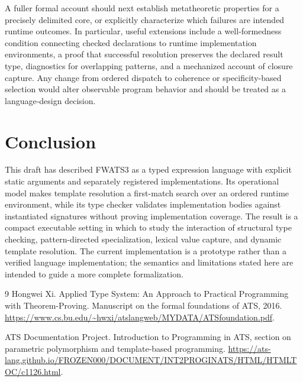 \documentclass[11pt]{article}
\begin{document}
A fuller formal account should next establish metatheoretic properties for a
precisely delimited core, or explicitly characterize which failures are
intended runtime outcomes. In particular, useful extensions include a
well-formedness condition connecting checked declarations to runtime
implementation environments, a proof that successful resolution preserves
the declared result type, diagnostics for overlapping patterns, and a
mechanized account of closure capture. Any change from
ordered dispatch to coherence or specificity-based selection would alter
observable program behavior and should be treated as a language-design
decision.

\section{Conclusion}

This draft has described FWATS3 as a typed expression language with explicit
static arguments and separately registered implementations. Its operational
model makes template resolution a first-match search over an ordered runtime
environment, while its type checker validates implementation bodies against
instantiated signatures without proving implementation coverage. The result
is a compact executable setting in which to study the interaction of
structural type checking, pattern-directed specialization, lexical value
capture, and dynamic template resolution. The current implementation is a
prototype rather than a verified language implementation; the semantics and
limitations stated here are intended to guide a more complete formalization.

\begin{thebibliography}{9}
Hongwei Xi.
\newblock Applied Type System: An Approach to Practical Programming with
Theorem-Proving.
\newblock Manuscript on the formal foundations of ATS, 2016.
\newblock \url{https://www.cs.bu.edu/~hwxi/atslangweb/MYDATA/ATSfoundation.pdf}.

ATS Documentation Project.
\newblock Introduction to Programming in ATS, section on parametric
polymorphism and template-based programming.
\newblock \url{https://ats-lang.github.io/FROZEN000/DOCUMENT/INT2PROGINATS/HTML/HTMLTOC/c1126.html}.
\end{thebibliography}
\end{document}
